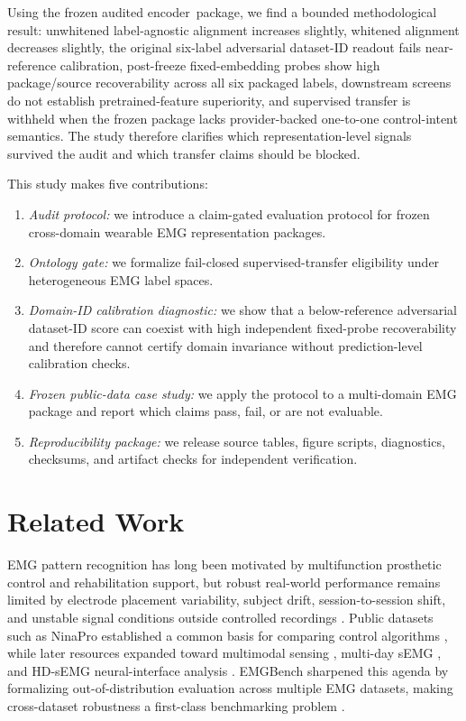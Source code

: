 \documentclass[journal]{IEEEtran}
\newcommand{\method}{audited encoder}
\begin{document}
Using the frozen \method\ package, we find a bounded methodological result: unwhitened label-agnostic alignment increases slightly, whitened alignment decreases slightly, the original six-label adversarial dataset-ID readout fails near-reference calibration, post-freeze fixed-embedding probes show high package/source recoverability across all six packaged labels, downstream screens do not establish pretrained-feature superiority, and supervised transfer is withheld when the frozen package lacks provider-backed one-to-one control-intent semantics. The study therefore clarifies which representation-level signals survived the audit and which transfer claims should be blocked.

This study makes five contributions:
\begin{enumerate}[leftmargin=1.5em]
    \item \emph{Audit protocol:} we introduce a claim-gated evaluation protocol for frozen cross-domain wearable EMG representation packages.
    \item \emph{Ontology gate:} we formalize fail-closed supervised-transfer eligibility under heterogeneous EMG label spaces.
    \item \emph{Domain-ID calibration diagnostic:} we show that a below-reference adversarial dataset-ID score can coexist with high independent fixed-probe recoverability and therefore cannot certify domain invariance without prediction-level calibration checks.
    \item \emph{Frozen public-data case study:} we apply the protocol to a multi-domain EMG package and report which claims pass, fail, or are not evaluable.
    \item \emph{Reproducibility package:} we release source tables, figure scripts, diagnostics, checksums, and artifact checks for independent verification.
\end{enumerate}

\section{Related Work}
EMG pattern recognition has long been motivated by multifunction prosthetic control and rehabilitation support, but robust real-world performance remains limited by electrode placement variability, subject drift, session-to-session shift, and unstable signal conditions outside controlled recordings \cite{scheme2011state,felici2020limits,yang2024emgbench}. Public datasets such as NinaPro established a common basis for comparing control algorithms \cite{atzori2014ninapro}, while later resources expanded toward multimodal sensing \cite{giordaniello2017meganepro,newman2022harmonic}, multi-day sEMG \cite{pradhan2022grabmyo}, and HD-sEMG neural-interface analysis \cite{jiang2021hyser}. EMGBench sharpened this agenda by formalizing out-of-distribution evaluation across multiple EMG datasets, making cross-dataset robustness a first-class benchmarking problem \cite{yang2024emgbench}.
\end{document}
